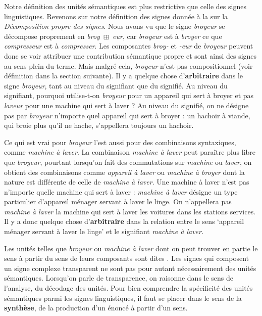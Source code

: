 Notre définition des unités sémantiques est plus restrictive que celle des signes linguistiques. Revenons sur notre définition des signes donnée à la  sur la \textit{Décomposition propre des signes}. Nous avons vu que le signe \textit{broyeur} se décompose proprement en \textit{broy~}${\boxplus}$\textit{~eur}, car \textit{broyeur} est à \textit{broyer} ce que \textit{compresseur} est à \textit{compresser}. Les composantes \textit{broy-} et \textit{{}-eur} de \textit{broyeur} peuvent donc se voir attribuer une contribution sémantique propre et sont ainsi des signes au sens plein du terme. Mais malgré cela, \textit{broyeur} n’est pas compositionnel (voir définition dans la section suivante). Il y a quelque chose d’\textbf{arbitraire} dans le signe \textit{broyeur}, tant au niveau du signifiant que du signifié. Au niveau du signifiant, pourquoi utilise-t-on \textit{broyeur} pour un appareil qui sert à broyer et pas \textit{laveur} pour une machine qui sert à laver ? Au niveau du signifié, on ne désigne pas par \textit{broyeur} n’importe quel appareil qui sert à broyer : un hachoir à viande, qui broie plus qu’il ne hache, s’appellera toujours un hachoir.

Ce qui est vrai pour \textit{broyeur} l’est aussi pour des combinaisons syntaxiques, comme \textit{machine à laver}. La combinaison \textit{machine à laver} peut paraître plus libre que \textit{broyeur}, pourtant lorsqu’on fait des commutations sur \textit{machine} ou \textit{laver}, on obtient des combinaisons comme \textit{appareil à laver} ou \textit{machine à broyer} dont la nature est différente de celle de \textit{machine à laver}. Une machine à laver n’est pas n’importe quelle machine qui sert à laver : \textit{machine à laver} désigne un type particulier d’appareil ménager servant à laver le linge. On n’appellera pas \textit{machine à laver} la machine qui sert à laver les voitures dans les stations services. Il y a donc quelque chose d’\textbf{arbitraire} dans la relation entre le sens ‘appareil ménager servant à laver le linge’ et le signifiant \textit{machine à laver.}

Les unités telles que \textit{broyeur} ou \textit{machine à laver} dont on peut trouver en partie le sens à partir du sens de leurs composants sont dites . Les signes qui composent un signe complexe transparent ne sont pas pour autant nécessairement des unités sémantiques. Lorsqu’on parle de transparence, on raisonne dans le sens de l’analyse, du décodage des unités. Pour bien comprendre la spécificité des unités sémantiques parmi les signes linguistiques, il faut se placer dans le sens de la \textbf{synthèse}, de la production d’un énoncé à partir d’un sens.

